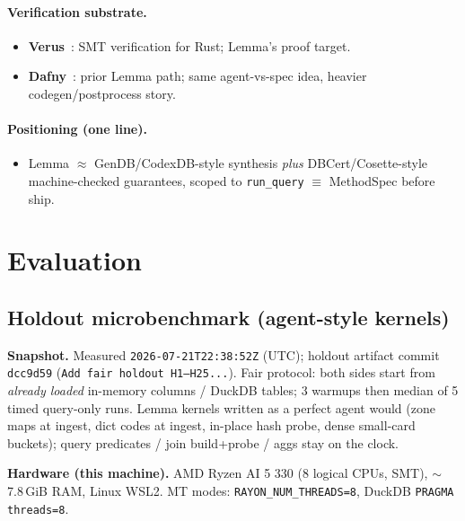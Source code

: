 \documentclass[sigconf, nonacm]{acmart}
\begin{document}
\paragraph{Verification substrate.}
\begin{itemize}
  \item \textbf{Verus}~\cite{Lattuada2023Verus}: SMT verification for Rust; Lemma's proof target.
  \item \textbf{Dafny}~\cite{Leino2010Dafny}: prior Lemma path; same agent-vs-spec idea, heavier codegen/postprocess story.
\end{itemize}

\paragraph{Positioning (one line).}
\begin{itemize}
  \item Lemma $\approx$ GenDB/CodexDB-style synthesis \emph{plus} DBCert/Cosette-style machine-checked guarantees, scoped to \texttt{run\_query} $\equiv$ MethodSpec before ship.
\end{itemize}

\section{Evaluation}

\subsection{Holdout microbenchmark (agent-style kernels)}
\label{sec:holdout-eval}

\noindent\textbf{Snapshot.}
Measured \texttt{2026-07-21T22:38:52Z} (UTC); holdout artifact commit \texttt{dcc9d59}
(\texttt{Add fair holdout H1--H25...}). Fair protocol: both sides
start from \emph{already loaded} in-memory columns / DuckDB tables; 3 warmups then
median of 5 timed query-only runs. Lemma kernels written as a perfect agent would
(zone maps at ingest, dict codes at ingest, in-place hash probe, dense small-card
buckets); query predicates / join build+probe / aggs stay on the clock.

\noindent\textbf{Hardware (this machine).}
AMD Ryzen AI 5 330 (8 logical CPUs, SMT), $\sim$7.8\,GiB RAM, Linux WSL2.
MT modes: \texttt{RAYON\_NUM\_THREADS=8}, DuckDB \texttt{PRAGMA threads=8}.
\end{document}
